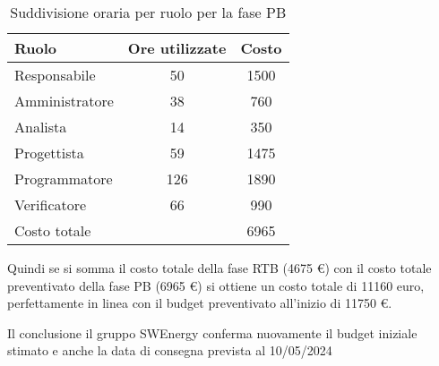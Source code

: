 \begin{table}[H]
	\centering
	\begin{tabular}{l|c|c}
		\textbf{Ruolo}         & \textbf{Ore utilizzate} 	& \textbf{Costo}\\
		\hline
		Responsabile            & 50                 & 1500     \\
		Amministratore          & 38                 & 760    \\
		Analista                & 14                 & 350     \\
		Progettista             & 59                 & 1475      \\
		Programmatore           & 126                & 1890      \\
		Verificatore            & 66                 & 990     \\
		\hline
		Costo totale			&                	 & 6965     \\
	\end{tabular}
	\caption{Suddivisione oraria per ruolo per la fase PB}  
\end{table}

Quindi se si somma il costo totale della fase RTB (4675 \euro) con il costo totale preventivato della fase PB (6965 \euro) si ottiene 
un costo totale di 11160 euro, perfettamente in linea con il budget preventivato all'inizio di 11750 \euro.


Il conclusione il gruppo SWEnergy conferma nuovamente il budget iniziale stimato e anche la data di consegna prevista al 10/05/2024



